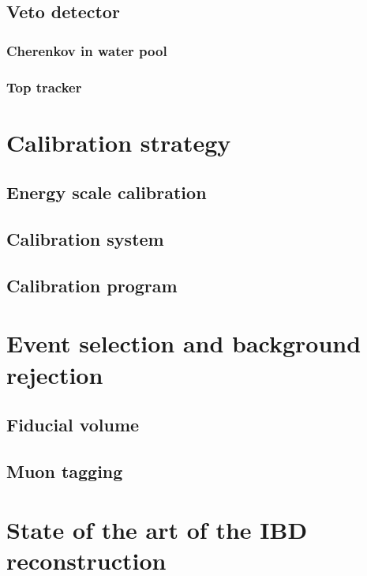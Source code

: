 \subsection{Veto detector}

\subsubsection{Cherenkov in water pool}

\subsubsection{Top tracker}

\section{Calibration strategy}

\subsection{Energy scale calibration}

\subsection{Calibration system}

\subsection{Calibration program}

\section{Event selection and background rejection}


\subsection{Fiducial volume}

\subsection{Muon tagging}

\section{State of the art of the IBD reconstruction}

